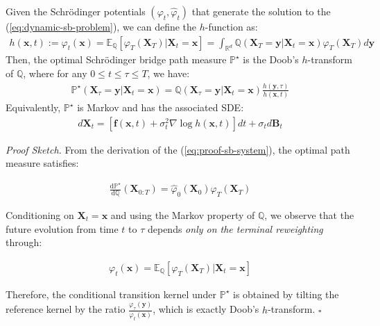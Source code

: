 \documentclass{article}
\begin{document}
\begin{corollary}\label{eq:sb-doob-h-transform}
    Given the Schrödinger potentials $(\varphi_t,\hat\varphi_t)$ that generate the solution to the (\ref{eq:dynamic-sb-problem}), we can define the $h$-function as:
    \begin{align}
        h(\boldsymbol{x},t):=\varphi_t(\boldsymbol{x})=\mathbb{E}_{\mathbb{Q}}[\varphi_T(\boldsymbol{X}_T) |\boldsymbol{X}_t=\boldsymbol{x}]=\int_{\mathbb{R}^d}\mathbb{Q}(\boldsymbol{X}_T=\boldsymbol{y}|\boldsymbol{X}_t=\boldsymbol{x})\varphi_T(\boldsymbol{X}_T)d\boldsymbol{y}\tag{$h$-Function for SB}
    \end{align}
    Then, the optimal Schrödinger bridge path measure $\mathbb{P}^\star$ is the Doob's $h$-transform of $\mathbb{Q}$, where for any $0\leq t\leq \tau\leq T$, we have:
    \begin{align}
        \mathbb{P}^\star(\boldsymbol{X}_{\tau }=\boldsymbol{y}|\boldsymbol{X}_t=\boldsymbol{x})=\mathbb{Q}(\boldsymbol{X}_{\tau}=\boldsymbol{y}|\boldsymbol{X}_t=\boldsymbol{x})\frac{h(\boldsymbol{y},\tau )}{h(\boldsymbol{x},t)}\tag{Doob's $h$-Transform for SB}\label{eq:doob-h-sb-eq}
    \end{align}
    Equivalently, $\mathbb{P}^\star$ is Markov and has the associated SDE:
    \begin{align}
        d\boldsymbol{X}_t=\left[\boldsymbol{f}(\boldsymbol{x},t)+\sigma_t^2\nabla\log h (\boldsymbol{x},t)\right]dt+\sigma_td\boldsymbol{B}_t\tag{Doob's $h$-Transform SDE}
    \end{align}
\end{corollary}

\textit{Proof Sketch.} From the derivation of the (\ref{eq:proof-sb-system}), the optimal path measure satisfies:
\begin{small}
\begin{align}
    \frac{\mathrm{d}\mathbb{P}^\star}{\mathrm{d}\mathbb{Q}}(\boldsymbol{X}_{0:T})=\hat\varphi_0(\boldsymbol{X}_0)\varphi_T(\boldsymbol{X}_T)
\end{align}
\end{small}
Conditioning on $\boldsymbol{X}_t=\boldsymbol{x}$ and using the Markov property of $\mathbb{Q}$, we observe that the future evolution from time $t$ to $\tau$ depends \textit{only on the terminal reweighting} through:
\begin{small}
\begin{align}
    \varphi_t(\boldsymbol{x})=\mathbb{E}_{\mathbb{Q}}[\varphi_T(\boldsymbol{X}_T)|\boldsymbol{X}_t=\boldsymbol{x}]
\end{align}
\end{small}
Therefore, the conditional transition kernel under $\mathbb{P}^\star$ is obtained by tilting the reference kernel by the ratio $\frac{\varphi_\tau(\boldsymbol{y})}{\varphi_t(\boldsymbol{x})}$, which is exactly Doob's $h$-transform. \hfill $\square$
\end{document}
